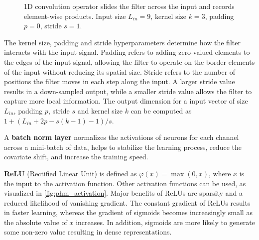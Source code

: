 \begin{figure}[!htb]
\begin{center}
\caption{1D convolution operator slides the filter across the input and records element-wise products. Input size $L_{in}=9$, kernel size $k=3$, padding $p=0$, stride $s=1$.}
\label{fig:phm_convolution}
\end{center}
\end{figure}


The kernel size, padding and stride hyperparameters determine how the filter interacts with the input signal. Padding refers to adding zero-valued elements to the edges of the input signal, allowing the filter to operate on the border elements of the input without reducing its spatial size. Stride refers to the number of positions the filter moves in each step along the input. A larger stride value results in a down-sampled output, while a smaller stride value allows the filter to capture more local information.
The output dimension for a input vector of size $L_{in}$, padding $p$, stride $s$ and kernel size $k$ can be computed as $1+(L_{in}+2p-s(k-1)-1)/s$.


A \textbf{batch norm layer} normalizes the activations of neurons for each channel across a mini-batch of data, helps to stabilize the learning process, reduce the covariate shift, and increase the training speed. 

\textbf{ReLU} (Rectified Linear Unit) is defined as $\varphi(x) = \max(0, x)$, where $x$ is the input to the activation function. Other activation functions can be used, as visualized in \cref{fig:phm_activation}. Major benefits of ReLUs are sparsity and a reduced likelihood of vanishing gradient. The constant gradient of ReLUs results in faster learning, whereas the gradient of sigmoids becomes increasingly small as the absolute value of $x$ increases. In addition, sigmoids are more likely to generate some non-zero value resulting in dense representations.

